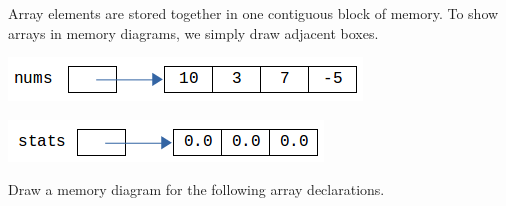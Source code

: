
Array elements are stored together in one contiguous block of memory.
To show arrays in memory diagrams, we simply draw adjacent boxes.

\begin{multicols}{2}

\begin{center}

\vspace{1ex}
\includegraphics[scale=0.65]{array-diagram1.png}
\end{center}

\columnbreak

\begin{center}

\vspace{1ex}
\includegraphics[scale=0.65]{array-diagram2.png}
\end{center}

\end{multicols}




\Q Draw a memory diagram for the following array declarations.

